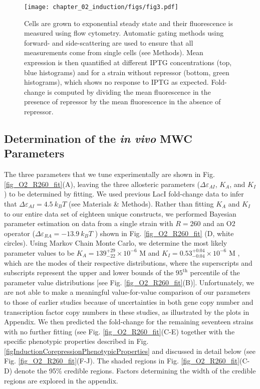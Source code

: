 \begin{figure}[h!]
	\centering \texttt{[image: chapter\_02\_induction/figs/fig3.pdf]}
	\caption[An experimental pipeline for high-throughput fold-change
		measurements.]{Cells are grown to exponential steady state and their
	fluorescence is measured using flow cytometry. Automatic gating methods using
	forward- and side-scattering are used to ensure that all measurements come from
	single cells (see Methods). Mean expression is then quantified at different
	IPTG concentrations (top, blue histograms) and for a strain without repressor
	(bottom, green histograms), which shows no response to IPTG as expected.
	Fold-change is computed by dividing the mean fluorescence in the presence of
	repressor by the mean fluorescence in the absence of repressor.}
\label{fig_experimental_flowchart}
\end{figure}

\subsection{Determination of the \textit{in vivo} MWC Parameters}

The three parameters that we tune experimentally are shown in
Fig. \ref{fig_O2_R260_fit}(A), leaving the three allosteric parameters
($\Delta \varepsilon_{AI}$, $K_A$, and $K_I$) to be determined by fitting. We
used previous LacI fold-change data \cite{Brewster2014} to infer that
$\Delta\varepsilon_{AI} = 4.5~k_BT$ (see Materials \& Methods). Rather than fitting $K_A$ and $K_I$ to our entire
data set of eighteen unique constructs, we performed Bayesian parameter
estimation on data from a single strain with $R=260$ and an O2 operator
($\Delta\varepsilon_{RA}=-13.9~k_BT$ \cite{Garcia2011}) shown in
Fig. \ref{fig_O2_R260_fit} (D, white circles). Using Markov Chain Monte
Carlo, we determine the most likely parameter values to be $K_A=139^{+29}_{-22}
\times 10^{-6}$ M and $K_I=0.53^{+0.04}_{-0.04} \times 10^{-6}$ M
, which are the modes of their respective distributions, where the
superscripts and subscripts represent the upper and lower bounds of the
$95^\text{th}$ percentile of the parameter value distributions [see
Fig. \ref{fig_O2_R260_fit}(B)]. Unfortunately, we are not able to make a
meaningful value-for-value comparison of our parameters to those of earlier
studies \cite{Daber2009, Daber2011a} because of uncertainties in both gene copy
number and transcription factor copy numbers in these studies, as illustrated by
the plots in Appendix. We then predicted the fold-change
for the remaining seventeen strains with no further fitting (see
Fig. \ref{fig_O2_R260_fit}(C-E) together with the specific
phenotypic properties described in Fig. \ref{figInductionCorepressionPhenotypicProperties} and discussed in detail
below (see Fig. \ref{fig_O2_R260_fit}(F-J). The shaded regions in
Fig. \ref{fig_O2_R260_fit}(C-D) denote the 95\% credible regions.
Factors determining the width of the credible regions are explored in the appendix.


